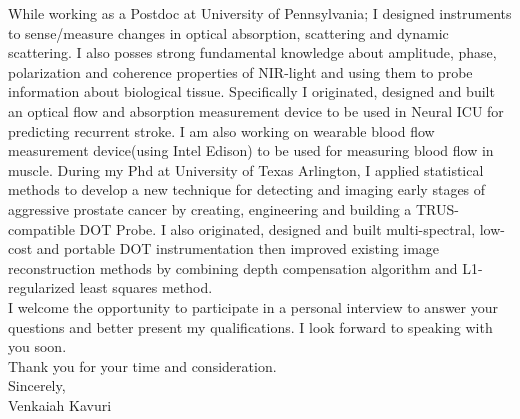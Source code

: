 \documentclass{my_cv}
\begin{document}
While working as a Postdoc at University of Pennsylvania; I designed instruments to sense/measure changes in optical absorption, scattering and dynamic scattering. I also posses strong fundamental knowledge about amplitude, phase, polarization and coherence properties of NIR-light and using them to probe information about biological tissue. Specifically I originated, designed and built an optical flow and absorption measurement device to be used in Neural ICU for predicting recurrent stroke. 
I am also working on wearable blood flow measurement device(using Intel Edison) to be used for measuring blood flow in muscle. During my Phd at University of Texas Arlington, I applied statistical methods to develop a new technique for detecting and imaging early stages of aggressive prostate cancer by creating, engineering and building a TRUS-compatible DOT Probe. I also originated, designed and built multi-spectral, low-cost and portable DOT instrumentation then improved existing image reconstruction methods by combining depth compensation algorithm and L1-regularized least squares method.\\

\vspace{2mm} 
I welcome the opportunity to participate in a personal interview to answer your questions and better present my qualifications. I look forward to speaking with you soon.\\
\vspace{2mm} 
Thank you for your time and consideration.\\
\vspace{10mm} 
Sincerely,\\

\vspace{5mm} 
Venkaiah Kavuri\\
\end{document}
